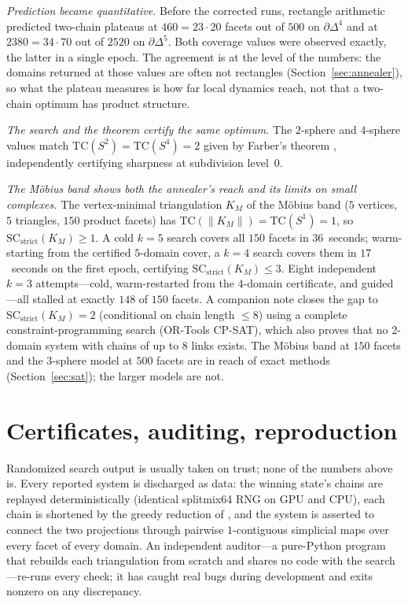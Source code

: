 \documentclass[12pt]{article}
\newcommand{\TC}{\mathrm{TC}}
\newcommand{\SC}{\mathrm{SC}}
\newcommand{\SCst}{\SC_{\mathrm{strict}}}
\begin{document}
\emph{Prediction became quantitative.}  Before the corrected runs,
rectangle arithmetic predicted two-chain plateaus at $460=23\cdot 20$
facets out of $500$ on $\partial\Delta^4$ and at $2380=34\cdot 70$ out
of $2520$ on $\partial\Delta^5$.  Both coverage values were observed
exactly, the latter in a single epoch.  The agreement is at the level of
the numbers: the domains returned at those values are often not
rectangles (Section~\ref{sec:annealer}), so what the plateau measures is
how far local dynamics reach, not that a two-chain optimum has product
structure.

\emph{The search and the theorem certify the same optimum.}  The
$2$-sphere and $4$-sphere values match $\TC(S^2)=\TC(S^4)=2$ given by
Farber's theorem \cite{F03}, independently certifying sharpness at
subdivision level~$0$.

\emph{The M\"obius band shows both the annealer's reach and its limits
on small complexes.}  The vertex-minimal triangulation $K_M$ of the
M\"obius band ($5$ vertices, $5$ triangles, $150$ product facets) has
$\TC(\|K_M\|)=\TC(S^1)=1$, so $\SCst(K_M)\ge1$.  A cold $k{=}5$
search covers all $150$ facets in $36$~seconds; warm-starting from the
certified $5$-domain cover, a $k{=}4$ search covers them in $17$~seconds
on the first epoch, certifying $\SCst(K_M)\le3$.  Eight independent
$k{=}3$ attempts---cold, warm-restarted from the $4$-domain certificate,
and guided---all stalled at exactly $148$ of $150$ facets.  A companion
note \cite{PM26} closes the gap to $\SCst(K_M)=2$ (conditional on chain
length $\le8$) using a complete constraint-programming search (OR-Tools
CP-SAT), which also proves that no $2$-domain system with chains of up
to $8$ links exists.  The M\"obius band at $150$ facets and the
$3$-sphere model at $500$ facets are in reach of exact methods
(Section~\ref{sec:sat}); the larger models are not.

\section{Certificates, auditing, reproduction}\label{sec:repro}

Randomized search output is usually taken on trust; none of the numbers
above is.  Every reported system is discharged as data: the winning
state's chains are replayed deterministically (identical splitmix64 RNG
on GPU and CPU), each chain is shortened by the greedy reduction of
\cite[Algorithm 2]{OLGB21}, and the system is asserted to connect the
two projections through pairwise $1$-contiguous simplicial maps over
every facet of every domain.  An independent auditor---a pure-Python
program that rebuilds each triangulation from scratch and shares no
code with the search---re-runs every check; it has caught real bugs
during development and exits nonzero on any discrepancy.
\end{document}

